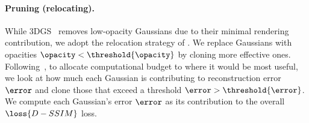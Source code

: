     \paragraph{Pruning (relocating).}
      While 3DGS~\cite{kerbl20233d} removes low-opacity Gaussians due to their
      minimal rendering contribution, we adopt the relocation strategy of
      \citet{kheradmand20243d}.
      We replace Gaussians with opacities $\opacity < \threshold{\opacity}$ by
      cloning more effective ones.
      Following~\citet{bulo2024revising}, to allocate computational budget to where
      it would be most useful, we look at how much each Gaussian is contributing to
      reconstruction error $\error$ and clone those that exceed a threshold $\error
        > \threshold{\error}$.
      We compute each Gaussian's error $\error$ as its contribution to the
      overall $\loss{D-SSIM}$ loss.



      

